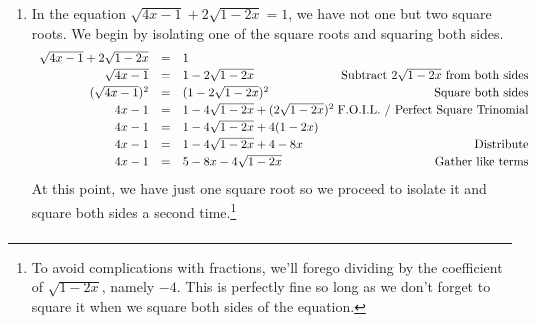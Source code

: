 \documentclass{ximera}
\begin{document}
{{{\begin{example}
\begin{enumerate}
\[\begin{array}{rclr}
2y + 1 & = & \dfrac{2\sqrt{2}}{27} & \\ [8pt]
2y  & = & \dfrac{2 \sqrt{2}}{27}  - 1 & \text{Subtract $1$} \\[8pt]

2y  & = & \dfrac{2 \sqrt{2}}{27}  - \dfrac{27}{27} & \text{Common denominators} \\ [8pt]

2y  & = & \dfrac{2 \sqrt{2} - 27}{27} & \text{Subtract fractions} \\[8pt]

y  & = & \dfrac{2 \sqrt{2} - 27}{54} & \text{Divide by $2$ $\left(\text{multiply by $\frac{1}{2}$} \right)$} \\

\end{array}\] Since we raised both sides to an \textit{odd} power, we don't need to worry about extraneous solutions but we encourage the reader to check the solution just for the fun of it.

\item In the equation $\sqrt{4x-1}  + 2\sqrt{1 - 2x} = 1$, we have not one but two square roots.  We begin by isolating one of the square roots and squaring both sides.\[ \begin{array}{rclr}

\sqrt{4x-1}  + 2\sqrt{1 - 2x} & = & 1 & \\ [2pt]

\sqrt{4x-1} & = & 1 - 2\sqrt{1-2x} & \hspace*{-.1in} \text{Subtract $2\sqrt{1 - 2x}$ from both sides} \\[2pt]

(\sqrt{4x-1})^2 & = & (1 - 2\sqrt{1-2x})^2 & \text{Square both sides} \\[2pt]

4x - 1 & = & 1 - 4\sqrt{1-2x} + (2\sqrt{1-2x})^2 & \hspace*{-.1in} \text{F.O.I.L. / Perfect Square Trinomial} \\[2pt]

4x - 1 & = & 1 - 4\sqrt{1-2x} + 4(1-2x) & \\[2pt]

4x - 1 & = & 1 - 4\sqrt{1-2x} + 4 - 8x & \text{Distribute} \\ [2pt]

4x - 1 & = & 5 - 8x - 4\sqrt{1-2x} & \text{Gather like terms} \\ \end{array} \] At this point, we have just one square root so we proceed to isolate it and square both sides a second time.\footnote{To avoid complications with fractions, we'll forego dividing by the coefficient of $\sqrt{1-2x}$, namely $-4$. This is perfectly fine so long as we don't forget to square it when we square both sides of the equation.} \[ \begin{array}{rclr}


\end{array}\]
\end{enumerate}
\end{example}}}}
\end{document}
